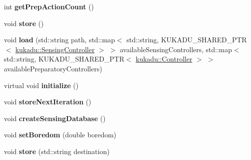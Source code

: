 \begin{DoxyCompactItemize}
\item 
int {\bfseries get\+Prep\+Action\+Count} ()\hypertarget{classkukadu_1_1ComplexController_ac51502d6bd897c221a993f88fac1db54}{}\label{classkukadu_1_1ComplexController_ac51502d6bd897c221a993f88fac1db54}

\item 
void {\bfseries store} ()\hypertarget{classkukadu_1_1ComplexController_ad79530c882119d956bb0d34669a2f4da}{}\label{classkukadu_1_1ComplexController_ad79530c882119d956bb0d34669a2f4da}

\item 
void {\bfseries load} (std\+::string path, std\+::map$<$ std\+::string, K\+U\+K\+A\+D\+U\+\_\+\+S\+H\+A\+R\+E\+D\+\_\+\+P\+TR$<$ \hyperlink{classkukadu_1_1SensingController}{kukadu\+::\+Sensing\+Controller} $>$ $>$ available\+Sensing\+Controllers, std\+::map$<$ std\+::string, K\+U\+K\+A\+D\+U\+\_\+\+S\+H\+A\+R\+E\+D\+\_\+\+P\+TR$<$ \hyperlink{classkukadu_1_1Controller}{kukadu\+::\+Controller} $>$ $>$ available\+Preparatory\+Controllers)\hypertarget{classkukadu_1_1ComplexController_ab2fc3490e103e0a884b767e9c34cea31}{}\label{classkukadu_1_1ComplexController_ab2fc3490e103e0a884b767e9c34cea31}

\item 
virtual void {\bfseries initialize} ()\hypertarget{classkukadu_1_1ComplexController_a22593ed34bf58ee205ddab925bc0d03f}{}\label{classkukadu_1_1ComplexController_a22593ed34bf58ee205ddab925bc0d03f}

\item 
void {\bfseries store\+Next\+Iteration} ()\hypertarget{classkukadu_1_1ComplexController_a13563bd973c9270984971638484df98d}{}\label{classkukadu_1_1ComplexController_a13563bd973c9270984971638484df98d}

\item 
void {\bfseries create\+Sensing\+Database} ()\hypertarget{classkukadu_1_1ComplexController_a3ebd8d88dc147461fbec6075478b4f7e}{}\label{classkukadu_1_1ComplexController_a3ebd8d88dc147461fbec6075478b4f7e}

\item 
void {\bfseries set\+Boredom} (double boredom)\hypertarget{classkukadu_1_1ComplexController_ae04169f9dcb3970089bb44c8905bcdc4}{}\label{classkukadu_1_1ComplexController_ae04169f9dcb3970089bb44c8905bcdc4}

\item 
void {\bfseries store} (std\+::string destination)\hypertarget{classkukadu_1_1ComplexController_a921fd27f700ee3ff2611546b63f23100}{}\label{classkukadu_1_1ComplexController_a921fd27f700ee3ff2611546b63f23100}


\end{DoxyCompactItemize}
